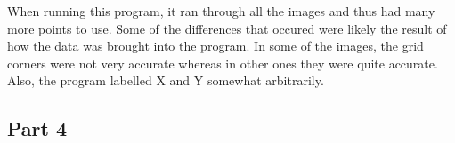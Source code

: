 \documentclass[11pt,psfig]{article}
\begin{document}
When running this program, it ran through all the images and thus had many more points to use. Some of the differences that occured were likely the result of how the data was brought into the program. In some of the images, the grid corners were not very accurate whereas in other ones they were quite accurate. Also, the program labelled X and Y somewhat arbitrarily.

\subsection{Part 4}
\end{document}
